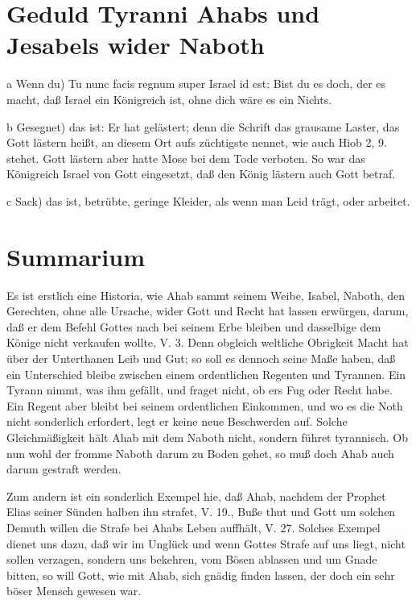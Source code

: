\section{Geduld Tyranni Ahabs und Jesabels wider Naboth}

a Wenn du) Tu nunc facis regnum super Israel id est: Bist du es doch, der es macht, daß Israel ein Königreich ist, ohne dich wäre es ein Nichts.

b Gesegnet) das ist: Er hat gelästert; denn die Schrift das grausame Laster, das Gott lästern heißt, an diesem Ort aufs züchtigste nennet, wie auch Hiob 2, 9. stehet. Gott lästern aber hatte Mose bei dem Tode verboten. So war das Königreich Israel von Gott eingesetzt, daß den König lästern auch Gott betraf.

c Sack) das ist, betrübte, geringe Kleider, als wenn man Leid trägt, oder arbeitet.

\section{Summarium}

Es ist erstlich eine Historia, wie Ahab sammt seinem Weibe, Isabel, Naboth, den Gerechten, ohne alle Ursache, wider Gott und Recht hat lassen erwürgen, darum, daß er dem Befehl Gottes nach bei seinem Erbe bleiben und dasselbige dem Könige nicht verkaufen wollte, V. 3. Denn obgleich weltliche Obrigkeit Macht hat über der Unterthanen Leib und Gut; so soll es dennoch seine Maße haben, daß ein Unterschied bleibe zwischen einem ordentlichen Regenten und Tyrannen. Ein Tyrann nimmt, was ihm gefällt, und fraget nicht, ob ers Fug oder Recht habe. Ein Regent aber bleibt bei seinem ordentlichen Einkommen, und wo es die Noth nicht sonderlich erfordert, legt er keine neue Beschwerden auf. Solche Gleichmäßigkeit hält Ahab mit dem Naboth nicht, sondern führet tyrannisch. Ob nun wohl der fromme Naboth darum zu Boden gehet, so muß doch Ahab auch darum gestraft werden.

Zum andern ist ein sonderlich Exempel hie, daß Ahab, nachdem der Prophet Elias seiner Sünden halben ihn strafet, V. 19., Buße thut und Gott um solchen Demuth willen die Strafe bei Ahabs Leben auffhält, V. 27. Solches Exempel dienet uns dazu, daß wir im Unglück und wenn Gottes Strafe auf uns liegt, nicht sollen verzagen, sondern uns bekehren, vom Bösen ablassen und um Gnade bitten, so will Gott, wie mit Ahab, sich gnädig finden lassen, der doch ein sehr böser Mensch gewesen war.

